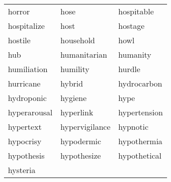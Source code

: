 \documentclass{minimal}
\begin{document}
\begin{longtable}{p{2.7cm}@{\hskip 0.2cm}p{2.7cm}@{\hskip 0.2cm}p{2.7cm}}
horror & hose & hospitable \\
hospitalize & host & hostage \\
hostile & household & howl \\
hub & humanitarian & humanity \\
humiliation & humility & hurdle \\
hurricane & hybrid & hydrocarbon \\
hydroponic & hygiene & hype \\
hyperarousal & hyperlink & hypertension \\
hypertext & hypervigilance & hypnotic \\
hypocrisy & hypodermic & hypothermia \\
hypothesis & hypothesize & hypothetical \\
hysteria
\end{longtable}
\end{document}
